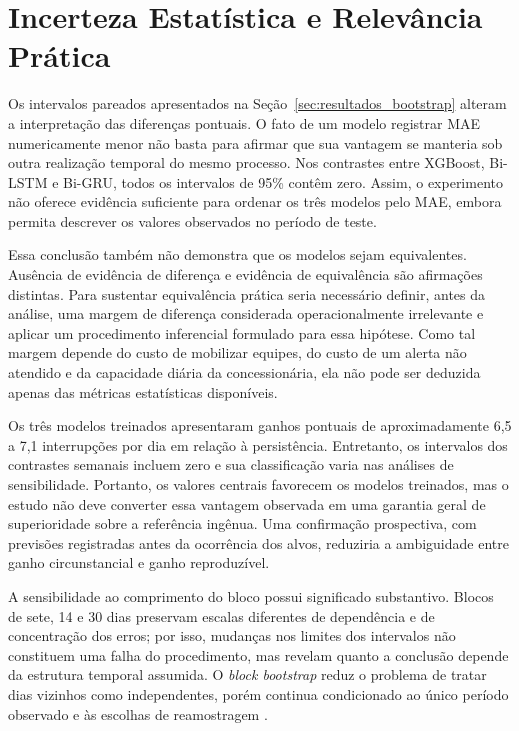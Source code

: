 \section{Incerteza Estatística e Relevância Prática}\label{sec:discussao_incerteza}

Os intervalos pareados apresentados na Seção~\ref{sec:resultados_bootstrap} alteram a interpretação das diferenças pontuais. O fato de um modelo registrar MAE numericamente menor não basta para afirmar que sua vantagem se manteria sob outra realização temporal do mesmo processo. Nos contrastes entre XGBoost, Bi-LSTM e Bi-GRU, todos os intervalos de 95\% contêm zero. Assim, o experimento não oferece evidência suficiente para ordenar os três modelos pelo MAE, embora permita descrever os valores observados no período de teste.

Essa conclusão também não demonstra que os modelos sejam equivalentes. Ausência de evidência de diferença e evidência de equivalência são afirmações distintas. Para sustentar equivalência prática seria necessário definir, antes da análise, uma margem de diferença considerada operacionalmente irrelevante e aplicar um procedimento inferencial formulado para essa hipótese. Como tal margem depende do custo de mobilizar equipes, do custo de um alerta não atendido e da capacidade diária da concessionária, ela não pode ser deduzida apenas das métricas estatísticas disponíveis.

Os três modelos treinados apresentaram ganhos pontuais de aproximadamente 6,5 a 7,1 interrupções por dia em relação à persistência. Entretanto, os intervalos dos contrastes semanais incluem zero e sua classificação varia nas análises de sensibilidade. Portanto, os valores centrais favorecem os modelos treinados, mas o estudo não deve converter essa vantagem observada em uma garantia geral de superioridade sobre a referência ingênua. Uma confirmação prospectiva, com previsões registradas antes da ocorrência dos alvos, reduziria a ambiguidade entre ganho circunstancial e ganho reproduzível.

A sensibilidade ao comprimento do bloco possui significado substantivo. Blocos de sete, 14 e 30 dias preservam escalas diferentes de dependência e de concentração dos erros; por isso, mudanças nos limites dos intervalos não constituem uma falha do procedimento, mas revelam quanto a conclusão depende da estrutura temporal assumida. O \textit{block bootstrap} reduz o problema de tratar dias vizinhos como independentes, porém continua condicionado ao único período observado e às escolhas de reamostragem \cite{lahiri2003resampling}.

